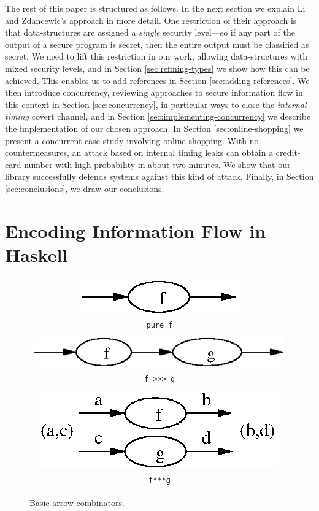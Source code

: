 \documentclass[times, 10pt,twocolumn]{article}
\begin{document}
The rest of this paper is structured as follows. In the next section
we explain Li and Zdancewic's approach in more detail. One restriction
of their approach is that data-structures are assigned a {\em single}
security level---so if any part of the output of a secure program is
secret, then the entire output must be classified as secret. We need
to lift this restriction in our work, allowing data-structures with
mixed security levels, and in Section \ref{sec:refining-types} we show
how this can be achieved. This enables us to add references in Section
\ref{sec:adding-references}. 
We
then introduce concurrency, reviewing approaches to secure information
flow in this context in Section \ref{sec:concurrency}, in particular
ways to close the {\em internal timing} covert channel, and in Section
\ref{sec:implementing-concurrency} we describe the implementation of
our chosen approach. In Section \ref{sec:online-shopping} we present a
concurrent case study involving online shopping. With no
countermeasures, an attack based on internal timing leaks can obtain a
credit-card number with high probability in about two minutes. We
show that our library successfully defends systems against this kind of
attack. Finally, in Section \ref{sec:conclusions}, we draw our
conclusions.

\section{Encoding Information Flow in Haskell} \label{sec:encodingIF}

\begin{figure}
\begin{center}
\begin{tabular}{c}
\includegraphics{puref.eps}\\
{\tt pure f}\\
\\
\includegraphics{fcompg.eps}\\
{\tt f >>> g}\\
\\
\includegraphics{fpairg.eps}\\
{\tt f***g}
\end{tabular}
\caption{Basic arrow combinators.} \label{fig:arrows}
\end{center}
\end{figure}
\end{document}
